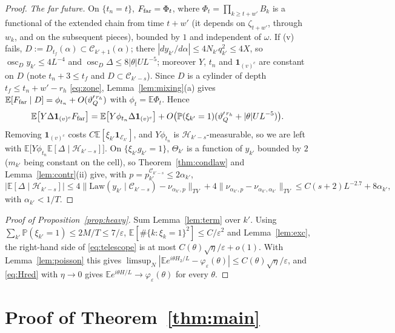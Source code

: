 \documentclass[11pt]{amsart}
\theoremstyle{definition}
\numberwithin{equation}{section}
\newcommand{\E}{\mathbb{E}}
\newcommand{\Prob}{\mathbb{P}}
\newcommand{\cH}{\mathcal{H}}
\newcommand{\cC}{\mathcal{C}}
\newcommand{\eps}{\varepsilon}
\newcommand{\ind}{\mathbf{1}}
\DeclareMathOperator{\osc}{osc}
\begin{document}
\begin{proof}
\emph{The far future.} On $\{t_n=t\}$, $F_{\rm far}=\Phi_t$, where $\Phi_t=\prod_{k\ge t+w'}B_k$ is a functional of the extended chain from time $t+w'$ (it
depends on $\zeta_{t+w'}$, through $w_k$, and on the subsequent pieces), bounded by $1$ and independent of $\omega$. If (v) fails,
$D:=D_{t_f}(\alpha)\subset\cC_{k'+1}(\alpha)$; there $|dy_{k'}/d\alpha|\le4N_{k'}q_{k'}^2\le4X$, so $\osc_Dy_{k'}\le4L^{-4}$ and
$\osc_D\Delta\le8|\theta|UL^{-5}$; moreover $Y$, $t_n$ and $\ind_{(v)^c}$ are constant on $D$ (note $t_n+3\le t_f$ and $D\subset\cC_{k'-s}$). Since $D$ is a cylinder of
depth $t_f\le t_n+w'-r_h$ \eqref{eq:zone}, Lemma~\ref{lem:mixing}(a) gives $\E[F_{\rm far}\mid D]=\phi_{t_n}+O(\vartheta_Q'^{\,r_h})$ with $\phi_t=\E\Phi_t$. Hence
\[
\E\big[Y\Delta\ind_{(v)^c}F_{\rm far}\big]=\E\big[Y\phi_{t_n}\Delta\ind_{(v)^c}\big]+O\big(\Prob(\xi_{k'}=1)(\vartheta_Q'^{\,r_h}+|\theta|UL^{-5})\big).
\]
Removing $\ind_{(v)^c}$ costs $C\E[\xi_{k'}\ind_{\mathcal E_{k'}}]$, and $Y\phi_{t_n}$ is $\cH_{k'-s}$-measurable, so we are left with
$\E\big[Y\phi_{t_n}\E[\Delta\mid\cH_{k'-s}]\big]$. On $\{\xi_{k'}g_{k'}=1\}$, $\Theta_{k'}$ is a function of $y_{k'}$ bounded by $2$ ($m_{k'}$ being constant on the cell), so
Theorem~\ref{thm:condlaw} and Lemma~\ref{lem:contr}(ii) give, with $p=p^{\cC_{k'-s}}_{k'}\le2\alpha_{k'}$,
\[
|\E[\Delta\mid\cH_{k'-s}]|\le4\big\|\mathrm{Law}(y_{k'}\mid\cC_{k'-s})-\nu_{\alpha_{k'},p}\big\|_{TV}+4\big\|\nu_{\alpha_{k'},p}-\nu_{\alpha_{k'},\alpha_{k'}}\big\|_{TV}
\le C(s+2)L^{-2.7}+8\alpha_{k'},
\]
with $\alpha_{k'}<1/T$.
\end{proof}

\begin{proof}[Proof of Proposition~\ref{prop:heavy}]
Sum Lemma~\ref{lem:term} over $k'$. Using $\sum_{k'}\Prob(\xi_{k'}=1)\le2M/T\le7/\eps$, $\E[\#\{k:\xi_k=1\}^2]\le C/\eps^2$ and Lemma~\ref{lem:exc}, the
right-hand side of \eqref{eq:telescope} is at most $C(\theta)\sqrt\eta/\eps+o(1)$. With Lemma~\ref{lem:poisson} this gives
$\limsup_N|\E e^{i\theta H_2/L}-\varphi_\eps(\theta)|\le C(\theta)\sqrt\eta/\eps$, and \eqref{eq:Hred} with $\eta\to0$ gives
$\E e^{i\theta H/L}\to\varphi_\eps(\theta)$ for every $\theta$.
\end{proof}
\section{Proof of Theorem~\ref{thm:main}}\label{sec:end}
\end{document}
